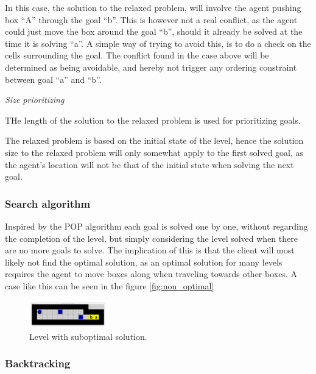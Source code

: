 \documentclass[Main]{subfiles}
\begin{document}
In this case, the solution to the relaxed problem, will involve the agent pushing box ``A'' through the goal ``b''. This is however not a real conflict, as the agent could just move the box around the goal ``b'', should it already be solved at the time it is solving ``a''. A simple way of trying to avoid this, is to do a check on the cells surrounding the goal. 
The conflict found in the case above will be determined as being avoidable, and hereby not trigger any ordering constraint between goal ``a'' and ``b''. 


\textit{Size prioritizing} 

THe length of the solution to the relaxed problem is used for prioritizing goals. 

The relaxed problem is based on the initial state of the level, hence the solution size to the relaxed problem will only somewhat apply to the first solved goal, as the agent's location will not be that of the initial state when solving the next goal. 



\subsubsection{Search algorithm}
Inspired by the POP algorithm each goal is solved one by one, without regarding the completion of the level, but simply considering the level solved when there are no more goals to solve. The implication of this is that the client will most likely not find the optimal solution, as an optimal solution for many levels requires the agent to move boxes along when traveling towards other boxes. A case like this can be seen in the figure \autoref{fig:non_optimal}
\begin{figure}[h!]
    \centering
    \includegraphics[width=0.3\textwidth]{non_optimal.png}
    \caption{Level with suboptimal solution.}
    \label{fig:non_optimal}
\end{figure}




\subsubsection{Backtracking}
\end{document}
